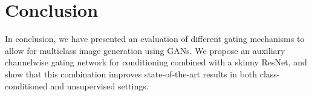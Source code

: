 

\section{Conclusion}
\noindent In conclusion, we have presented an evaluation of different gating mechanisms to allow for multiclass image generation using GANs. 
We propose an auxiliary channelwise gating network for conditioning combined with a skinny ResNet, and show that this combination improves state-of-the-art results in both class-conditioned and unsupervised settings.



